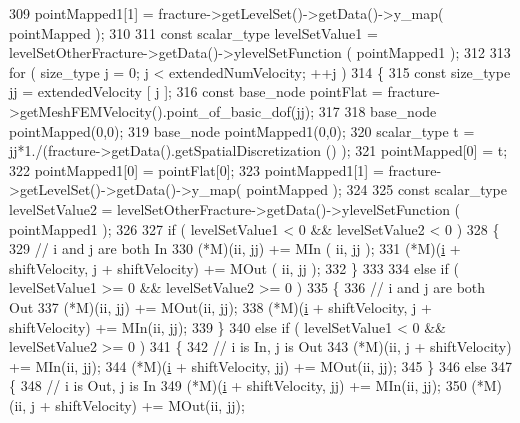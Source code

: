 \begin{DoxyCode}
309         pointMapped1[1] = fracture->getLevelSet()->getData()->y\_map( pointMapped );
310     
311         \textcolor{keyword}{const} scalar\_type levelSetValue1 = levelSetOtherFracture->getData()->ylevelSetFunction ( 
      pointMapped1 );
312 
313         \textcolor{keywordflow}{for} ( size\_type j = 0; j < extendedNumVelocity; ++j )
314         \{
315             \textcolor{keyword}{const} size\_type jj = extendedVelocity [ j ];
316             \textcolor{keyword}{const} base\_node pointFlat = fracture->getMeshFEMVelocity().point\_of\_basic\_dof(jj);
317         
318             base\_node pointMapped(0,0);
319             base\_node pointMapped1(0,0);
320             scalar\_type t = jj*1./(fracture->getData().getSpatialDiscretization () );
321             pointMapped[0] = t;
322             pointMapped1[0] = pointFlat[0];
323             pointMapped1[1] = fracture->getLevelSet()->getData()->y\_map( pointMapped );
324 
325             \textcolor{keyword}{const} scalar\_type levelSetValue2 = levelSetOtherFracture->getData()->ylevelSetFunction ( 
      pointMapped1 );
326 
327             \textcolor{keywordflow}{if} ( levelSetValue1 < 0 && levelSetValue2 < 0 )
328             \{
329                 \textcolor{comment}{// i and j are both In}
330                 (*M)(ii, jj) += MIn ( ii, jj );
331                 (*M)(\hyperlink{matrici_8m_a6f6ccfcf58b31cb6412107d9d5281426}{i} + shiftVelocity, j + shiftVelocity) += MOut ( ii, jj );
332             \}
333 
334             \textcolor{keywordflow}{else} \textcolor{keywordflow}{if} ( levelSetValue1 >= 0 && levelSetValue2 >= 0 )
335             \{
336                 \textcolor{comment}{// i and j are both Out}
337                 (*M)(ii, jj) += MOut(ii, jj);
338                 (*M)(\hyperlink{matrici_8m_a6f6ccfcf58b31cb6412107d9d5281426}{i} + shiftVelocity, j + shiftVelocity) += MIn(ii, jj);
339             \}
340             \textcolor{keywordflow}{else} \textcolor{keywordflow}{if} ( levelSetValue1 < 0 && levelSetValue2 >= 0 )
341             \{
342                 \textcolor{comment}{// i is In, j is Out}
343                 (*M)(ii, j + shiftVelocity) += MIn(ii, jj);
344                 (*M)(\hyperlink{matrici_8m_a6f6ccfcf58b31cb6412107d9d5281426}{i} + shiftVelocity, jj) += MOut(ii, jj);
345             \}
346             \textcolor{keywordflow}{else}
347             \{
348                 \textcolor{comment}{// i is Out, j is In}
349                 (*M)(\hyperlink{matrici_8m_a6f6ccfcf58b31cb6412107d9d5281426}{i} + shiftVelocity, jj) += MIn(ii, jj);
350                 (*M)(ii, j + shiftVelocity) += MOut(ii, jj);

\end{DoxyCode}
